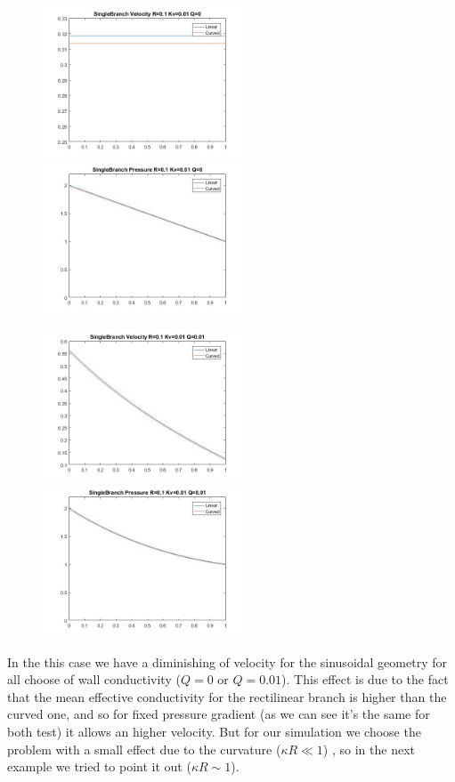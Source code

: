 \documentclass[a4paper]{report}
\begin{document}
\begin{figure}[htbp]
\centering
\includegraphics[width= 60mm]{SingleBranch_velocity_1}%
\qquad \qquad
\includegraphics[width= 60mm]{SingleBranch_Pressure_1}
\end{figure}
\begin{figure}[htbp]
\centering
\includegraphics[width= 60mm]{SingleBranch_velocity_2}%
\qquad \qquad
\includegraphics[width= 60mm]{SingleBranch_Pressure_2}
\end{figure}
In the this case we have a diminishing of velocity for the sinusoidal geometry for all choose of wall conductivity ($Q=0$ or $Q=0.01$). This effect is due to the fact that the mean effective conductivity for the rectilinear branch is higher than the curved one, and so for fixed pressure gradient (as we can see it's the same for both test) it allows an higher velocity. But for our simulation we choose the problem with a small effect due to the curvature ($\kappa R\ll1$) , so in the next example we tried to point it out ($\kappa R\sim1$).
\end{document}

